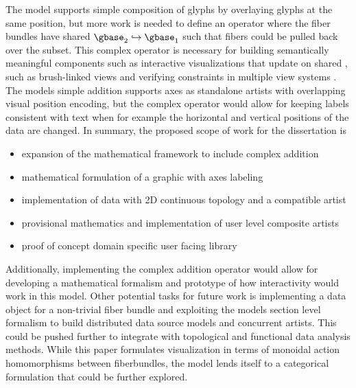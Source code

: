 \documentclass[../main.tex]{subfiles}
\begin{document}
The model supports simple composition of glyphs by overlaying glyphs at the same position, but more work is needed to define an operator where the fiber bundles have shared $\gbase_2 \hookrightarrow \gbase_1$ such that fibers could be pulled back over the subset. This complex operator is necessary for building semantically meaningful components such as interactive visualizations that update on shared \gbase, such as brush-linked views\cite{beckerBrushingScatterplots1987,bujaInteractiveData1991} and verifying constraints in multiple view systems \cite{hullmanKeeping2018}. The models simple addition supports axes as standalone artists with overlapping visual position encoding, but the complex operator would allow for keeping labels consistent with text when for example the horizontal and vertical positions of the data are changed. In summary, the proposed scope of work for the dissertation is
\begin{itemize}
    \item expansion of the mathematical framework to include complex addition
    \item mathematical formulation of a graphic with axes labeling
    \item implementation of data with 2D continuous topology and a compatible artist
    \item provisional mathematics and implementation of user level composite artists
    \item proof of concept domain specific user facing library 
\end{itemize}
Additionally, implementing the complex addition operator would allow for developing a mathematical formalism and prototype of how interactivity would work in this model. Other potential tasks for future work is implementing a data object for a non-trivial fiber bundle and exploiting the models section level formalism to build distributed data source models and concurrent artists. This could be pushed further to integrate with topological\cite{heineSurveyTopologybasedMethods2016} and functional \cite{ramsayFunctionalDataAnalysis2006a} data analysis methods. While this paper formulates visualization in terms of monoidal action homomorphisms between fiberbundles, the model lends itself to a categorical formulation\cite{fongInvitationAppliedCategory2019,milewskiCategoryTheoryProgrammers} that could be further explored. 
\end{document}
